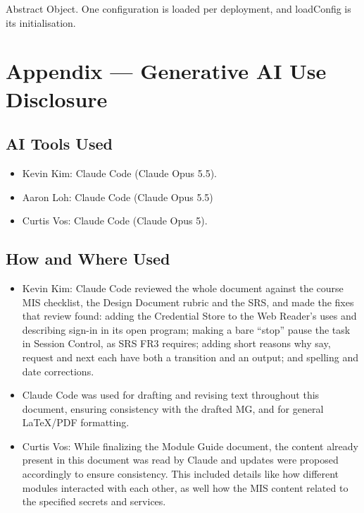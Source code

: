 \documentclass[12pt, titlepage]{article}
\begin{document}
Abstract Object. One configuration is loaded per deployment, and loadConfig is
its initialisation.

\newpage

\section{Appendix --- Generative AI Use Disclosure}

\subsection{AI Tools Used}
\begin{itemize}
\item Kevin Kim: Claude Code (Claude Opus 5.5).
\item Aaron Loh: Claude Code (Claude Opus 5.5)
\item Curtis Vos: Claude Code (Claude Opus 5).
\end{itemize}

\subsection{How and Where Used}
\begin{itemize}
\item Kevin Kim: Claude Code reviewed the whole document against the course MIS checklist,
the Design Document rubric and the SRS, and made the fixes that review found:
adding the Credential Store to the Web Reader's uses and describing sign-in in its
open program; making a bare ``stop'' pause the task in Session Control, as SRS FR3
requires; adding short reasons why say, request and next each have both a
transition and an output; and spelling and date corrections.
\item Claude Code was used for drafting and revising text throughout this document, ensuring consistency with the drafted MG,
and for general LaTeX/PDF formatting.
\item Curtis Vos: While finalizing the Module Guide document, the content already present in this document
was read by Claude and updates were proposed accordingly to ensure consistency. This included details like how different modules interacted
with each other, as well how the MIS content related to the specified secrets and services. 
\end{itemize}
\end{document}
